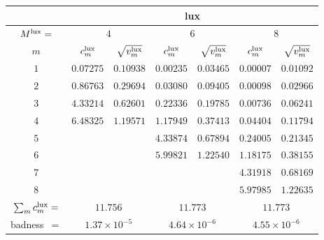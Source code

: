 \begin{tabular}{c|cc|cc|cc|}
&
\multicolumn{6}{|c|}{lux} \\
\hline
$M^{\mathrm{lux}}=$ &
 \multicolumn{2}{|c|}{$4$} &
 \multicolumn{2}{|c|}{$6$} &
 \multicolumn{2}{|c|}{$8$} \\
$m$ &
 $c^{\mathrm{lux}}_m$ & $\sqrt{v^{\mathrm{lux}}_m}$ &
 $c^{\mathrm{lux}}_m$ & $\sqrt{v^{\mathrm{lux}}_m}$ &
 $c^{\mathrm{lux}}_m$ & $\sqrt{v^{\mathrm{lux}}_m}$ \\
$1$ &
 $0.07275$ & $0.10938$ &
 $0.00235$ & $0.03465$ &
 $0.00007$ & $0.01092$ \\
$2$ &
 $0.86763$ & $0.29694$ &
 $0.03080$ & $0.09405$ &
 $0.00098$ & $0.02966$ \\
$3$ &
 $4.33214$ & $0.62601$ &
 $0.22336$ & $0.19785$ &
 $0.00736$ & $0.06241$ \\
$4$ &
 $6.48325$ & $1.19571$ &
 $1.17949$ & $0.37413$ &
 $0.04404$ & $0.11794$ \\
$5$ &
 $~$ & $~$ &
 $4.33874$ & $0.67894$ &
 $0.24005$ & $0.21345$ \\
$6$ &
 $~$ & $~$ &
 $5.99821$ & $1.22540$ &
 $1.18175$ & $0.38155$ \\
$7$ &
 $~$ & $~$ &
 $~$ & $~$ &
 $4.31918$ & $0.68169$ \\
$8$ &
 $~$ & $~$ &
 $~$ & $~$ &
 $5.97985$ & $1.22635$ \\
\hline
$\sum_m c^{\mathrm{lux}}_m=$ &
 \multicolumn{2}{|c|}{$11.756$} &
 \multicolumn{2}{|c|}{$11.773$} &
 \multicolumn{2}{|c|}{$11.773$} \\
badness~$=$ &
 \multicolumn{2}{|c|}{$1.37\times 10^{-5}$} &
 \multicolumn{2}{|c|}{$4.64\times 10^{-6}$} &
 \multicolumn{2}{|c|}{$4.55\times 10^{-6}$} \\
\end{tabular}
